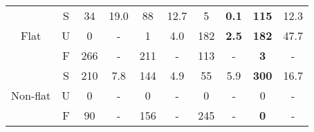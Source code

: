 \begin{table}[ht]
\begin{tabular}{|c|c|c|c|c|c|c|c|c|c|}
         \hline
         \cline{1-10}
        \multirow{3}{*}{\scriptsize{Flat}} 
         & S & 34 & 19.0 & 88 & 12.7 & 5 & {\bf 0.1}& {\bf 115}  & 12.3\\
        \cline{2-10}
         & U & 0 & - & 1 & 4.0 & 182 & {\bf 2.5} & {\bf 182} & 47.7 \\
         \cline{2-10}
         & F & 266 & - & 211 & - & 113 & - & {\bf 3} & - \\ \hline
         \cline{1-10}
        \multirow{3}{*}{\scriptsize{Non-flat}}
         & S & 210 & 7.8 & 144 & 4.9 & 55 & 5.9 &{\bf 300} & 16.7 \\
        \cline{2-10}
         & U & 0 & - & 0 & - & 0 & - & 0 & - \\
         \cline{2-10}
         & F & 90 & - & 156 & - & 245 & - & {\bf 0} & - \\ \hline
         \cline{1-10}
        \end{tabular}
            \label{table:arithmetic}
\end{table}